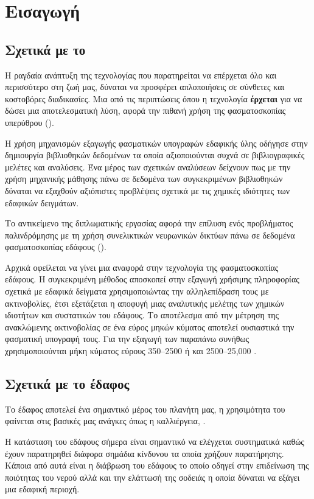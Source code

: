 \chapter{Εισαγωγή}
\label{ch:introduction}
\section{Σχετικά με το }
Η ραγδαία ανάπτυξη της τεχνολογίας που παρατηρείται να επέρχεται όλο και περισσότερο στη ζωή μας, δύναται να προσφέρει απλοποιήσεις σε σύνθετες και κοστοβόρες διαδικασίες. Μια από τις περιπτώσεις όπου η τεχνολογία \textbf{έρχεται} για να δώσει μια αποτελεσματική λύση, αφορά την πιθανή χρήση της φασματοσκοπίας υπερύθρου ().

Η χρήση μηχανισμών εξαγωγής φασματικών υπογραφών εδαφικής ύλης οδήγησε στην δημιουργία βιβλιοθηκών δεδομένων τα οποία αξιοποιούνται συχνά σε βιβλιογραφικές μελέτες και αναλύσεις. Ένα μέρος των σχετικών αναλύσεων δείχνουν πως με την χρήση μηχανικής μάθησης πάνω σε δεδομένα των συγκεκριμένων βιβλιοθηκών δύναται να εξαχθούν αξιόπιστες προβλέψεις σχετικά με τις χημικές ιδιότητες των εδαφικών δειγμάτων.

Το αντικείμενο της διπλωματικής εργασίας αφορά την επίλυση ενός προβλήματος παλινδρόμησης με τη χρήση συνελικτικών νευρωνικών δικτύων πάνω σε δεδομένα φασματοσκοπίας εδάφους ().

Αρχικά οφείλεται να γίνει μια αναφορά στην τεχνολογία της φασματοσκοπίας εδάφους. Η συγκεκριμένη μέθοδος αποσκοπεί στην εξαγωγή χρήσιμης πληροφορίας σχετικά με εδαφικά δείγματα χρησιμοποιώντας την αλληλεπίδραση τους με ακτινοβολίες, έτσι εξετάζεται η αποφυγή μιας αναλυτικής μελέτης των χημικών ιδιοτήτων και συστατικών του εδάφους. Το αποτέλεσμα από την μέτρηση της ανακλώμενης ακτινοβολίας σε ένα εύρος μηκών κύματος αποτελεί ουσιαστικά την φασματική υπογραφή τους. Για την εξαγωγή των παραπάνω συνήθως χρησιμοποιούνται μήκη κύματος εύρους 350–2500  ή και 2500–25,000 .

\section{Σχετικά με το έδαφος}
Το έδαφος αποτελεί ένα σημαντικό μέρος του πλανήτη μας, η χρησιμότητα του φαίνεται στις βασικές μας ανάγκες όπως η καλλιέργεια, .

Η κατάσταση του εδάφους σήμερα είναι σημαντικό να ελέγχεται συστηματικά καθώς έχουν παρατηρηθεί διάφορα σημάδια κίνδυνου τα οποία χρήζουν παρατήρησης. Κάποια από αυτά είναι η διάβρωση του εδάφους το οποίο οδηγεί στην επιδείνωση της ποιότητας του νερού αλλά και την ελάττωσή της σοδειάς η οποία δύναται να εξάγει μια εδαφική περιοχή. 


